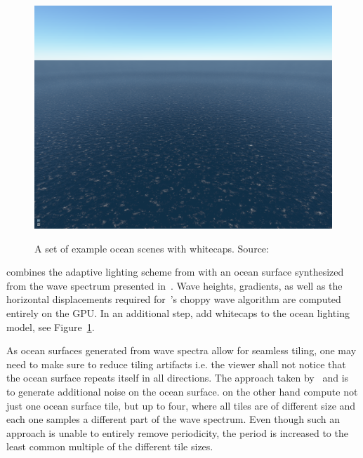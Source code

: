 \begin{figure}
{  \includegraphics[scale=0.125]{figures/Real-time_Animation_and_Rendering_of_Ocean_Whitecaps-004.png}
 }
\caption{A set of example ocean scenes with whitecaps. Source:~\cite{article:whitecaps}
}
\label{fig:dupuy:whitecaps}
\end{figure}
%
%
\citet{misc:oceanlightingfft} combines the adaptive lighting scheme
from \citet{article:oceanlighting} with an ocean surface synthesized
from the wave spectrum presented in~\citet{article:Elfouhaily1997}.
Wave heights, gradients, as well as the horizontal displacements
required for~\citeauthor{course:simulatingocean}'s choppy wave algorithm
are computed entirely on the GPU. In an additional step,
\citet{article:whitecaps} add whitecaps to the ocean lighting model,
see Figure~\ref{fig:dupuy:whitecaps}.

As ocean surfaces generated from wave spectra allow for seamless tiling,
one may need to make sure to reduce tiling artifacts i.e. the viewer
shall not notice that the ocean surface repeats itself in all directions.
The approach taken by~\citet{Rydahl:2009} and \citet{NVIDIA:Ocean} is to
generate additional noise on the ocean surface.
\citet{misc:oceanlightingfft,article:whitecaps}
on the other hand compute not just one ocean surface tile, but up to four,
where all tiles are of different size and each one samples a different
part of the wave spectrum. Even though such an approach is unable to
entirely remove periodicity, the period is increased to the least common
multiple of the different tile sizes.
